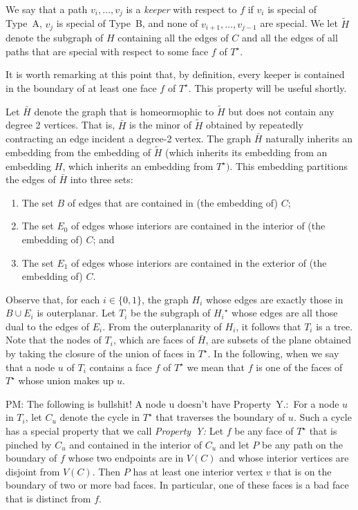 \documentclass{patmorin}
\newcommand{\dual}[1]{{#1}^\star}
\newcommand{\note}[2]{{\color{red}#1:~#2}}
\begin{document}
We say that a path $v_i,\ldots,v_j$ is a \emph{keeper} with respect to
$f$ if $v_i$ is special of Type~A, $v_j$ is special of Type~B, and none
of $v_{i+1},\ldots,v_{j-1}$ are special.  We let $\tilde{H}$ denote the
subgraph of $H$ containing all the edges of $C$ and all the edges of
all paths that are special with respect to some face $f$ of $\dual{T}$.

It is worth remarking at this point that, by definition, every keeper
is contained in the boundary of at least one face $f$ of $\dual{T}$.
This property will be useful shortly.

Let $\bar{H}$ denote the graph that is homeormophic to $\tilde{H}$ but does not
contain any degree 2 vertices.  That is, $\bar{H}$ is the minor of $\tilde{H}$
obtained by repeatedly contracting an edge incident a degree-2 vertex.
The graph $\bar{H}$ naturally inherits an embedding from the embedding of $\tilde{H}$ (which inherits its embedding from an embedding $H$, which inherits an embedding from $\dual{T})$.  This embedding partitions the edges of $\bar{H}$ into three sets:
\begin{enumerate}
  \item The set $B$ of edges that are contained in (the embedding of) $C$;
  \item The set $E_0$ of edges whose interiors are contained in the interior of (the embedding of) $C$; and
  \item The set $E_1$ of edges whose interiors are contained in the exterior of (the embedding of) $C$.
\end{enumerate}

Observe that, for each $i\in\{0,1\}$, the graph $H_i$ whose edges are
exactly those in $B\cup E_i$ is outerplanar.  Let $T_i$ be the subgraph of
$\dual{H_i}$ whose edges are all those dual to the edges of $E_i$. From
the outerplanarity of $H_i$, it follows that $T_i$ is a tree. Note that
the nodes of $T_i$, which are faces of $\bar{H}$, are subsets of the
plane obtained by taking the closure of the union of faces in $\dual{T}$.
In the following, when we say that a node $u$ of $T_i$ contains a face
$f$ of $\dual{T}$ we mean that $f$ is one of the faces of $\dual{T}$
whose union makes up $u$.

\note{PM: The following is bullshit! A node u doesn't have Property~Y.}
For a node $u$ in $T_i$, let $C_u$ denote the cycle in $\dual{T}$ that
traverses the boundary of $u$.  Such a cycle has a special property that
we call \emph{Property~Y:} Let $f$ be any face of $\dual{T}$ that is
pinched by $C_u$ and contained in the interior of $C_u$ and let $P$ be any
path on the boundary of $f$ whose two endpoints are in $V(C)$ and whose
interior vertices are disjoint from $V(C)$.  Then $P$ has at least one
interior vertex $v$ that is on the boundary of two or more bad faces. In
particular, one of these faces is a bad face that is distinct from $f$.
\end{document}
